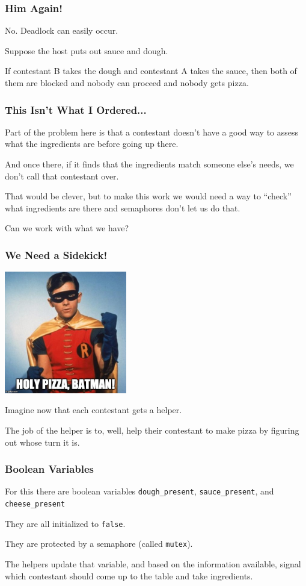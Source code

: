 \begin{frame}
\frametitle{Him Again!}

No. Deadlock can easily occur. 

Suppose the host puts out sauce and dough.

 If contestant B takes the dough and contestant A takes the sauce, then both of them are blocked and nobody can proceed and nobody gets pizza.

\end{frame}


\begin{frame}
\frametitle{This Isn't What I Ordered...}

Part of the problem here is that a contestant doesn't have a good way to assess what the ingredients are before going up there. 

And once there, if it finds that the ingredients match someone else's needs, we don't call that contestant over.

That would be clever, but to make this work we would need a way to ``check'' what ingredients are there and semaphores don't let us do that.

Can we work with what we have?

\end{frame}

\begin{frame}
\frametitle{We Need a Sidekick!}
\begin{center}
	\includegraphics[width=0.4\textwidth]{images/robin.jpg}
\end{center}

Imagine now that each contestant gets a helper. 

The job of the helper is to, well, help their contestant to make pizza by figuring out whose turn it is.

\end{frame}


\begin{frame}
\frametitle{Boolean Variables}

For this there are boolean variables \texttt{dough\_present}, \texttt{sauce\_present}, and \texttt{cheese\_present} 

They are all initialized to \texttt{false}. 

They are protected by a semaphore (called \texttt{mutex}).

The helpers update that variable, and based on the information available, signal which contestant should come up to the table and take ingredients.

\end{frame}

